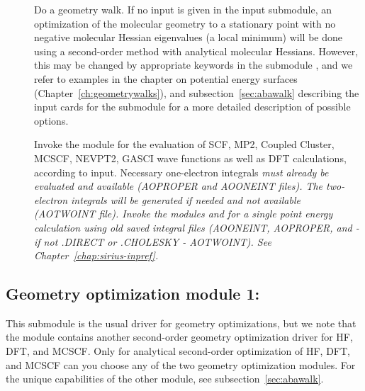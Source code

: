 \begin{description}
\item[]
Do a geometry walk.
If no input is given in the
 input submodule, an optimization of the molecular
geometry to a stationary point with no negative molecular Hessian eigenvalues (a
local minimum) will be done using a second-order method with
analytical molecular Hessians. However, this may be changed by appropriate
keywords in the submodule , and we refer to examples in
the chapter on potential energy surfaces
(Chapter~\ref{ch:geometrywalks}), and subsection~\ref{sec:abawalk}
describing the input cards for the  submodule for a more
detailed description of possible options.

\item[]
Invoke the {\sir} module for the evaluation of SCF, MP2, Coupled
Cluster, MCSCF, NEVPT2, GASCI wave functions as well as DFT calculations, according to input.
Necessary one-electron integrals \em{must} already be evaluated and available (AOPROPER and AOONEINT files).
The two-electron integrals will be generated if needed and not available (AOTWOINT file).
Invoke the modules {\her} and {\sir} for a single point energy calculation using old saved integral files (AOONEINT, AOPROPER, and - if not .DIRECT or .CHOLESKY - AOTWOINT).
See Chapter~\ref{chap:sirius-inpref}.
\end{description}

%

\subsection{Geometry optimization module 1: }\label{subsec:minimize}

This submodule is the usual driver for geometry optimizations,
but we note that the  module contains another second-order
geometry optimization driver for HF, DFT, and MCSCF.
Only for analytical second-order optimization of HF, DFT, and MCSCF can you choose
any of the two geometry optimization modules.
For the unique capabilities of the other module, see subsection~\ref{sec:abawalk}.

